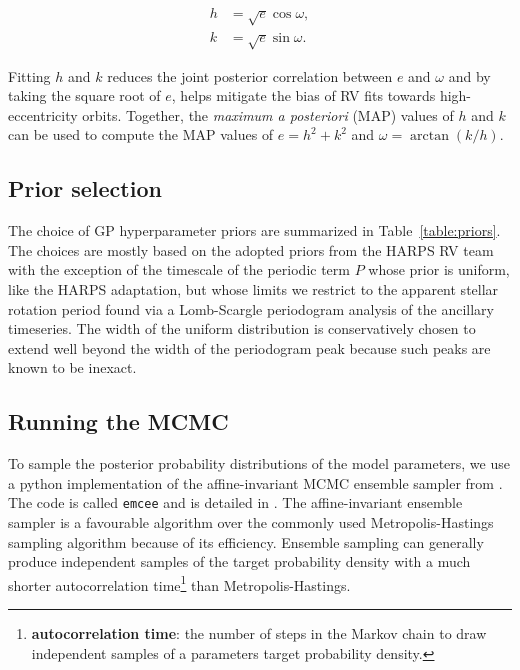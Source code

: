 \begin{align}
h &= \sqrt{e} \cos{\omega}, \\
k &= \sqrt{e} \sin{\omega}.
\end{align}

\noindent Fitting $h$ and $k$ reduces the joint posterior correlation between 
$e$ and $\omega$ and 
by taking the square root of $e$, helps mitigate the bias of RV fits towards 
high-eccentricity orbits. Together, the \emph{maximum a posteriori} (MAP) values of $h$ 
and $k$ can be used to compute the MAP values of $e=h^2 + k^2$ and $\omega=\arctan{(k/h)}$. 

\subsection{Prior selection}
The choice of GP hyperparameter priors are summarized in Table~\ref{table:priors}. 
The choices are mostly based on the adopted priors from the 
HARPS RV team with the exception of the timescale of the 
periodic term $P$ whose prior is uniform, like the HARPS adaptation, but whose 
limits we restrict to the apparent stellar rotation period found via a Lomb-Scargle 
periodogram analysis of the ancillary timeseries. The width of the uniform distribution 
is conservatively chosen 
to extend well beyond the width of the periodogram peak because such peaks are known 
to be inexact. \\



\subsection{Running the MCMC}
To sample the posterior probability distributions of the model parameters, we use a python 
implementation of the affine-invariant MCMC ensemble sampler from \cite{goodman10}. The code 
is called \texttt{emcee} and is detailed in \cite{foremanmackey13}. The affine-invariant 
ensemble sampler is a favourable algorithm over the commonly used Metropolis-Hastings sampling 
algorithm because of its efficiency. Ensemble sampling can generally produce independent samples 
of the target probability density with a much shorter autocorrelation 
time\footnote{\textbf{autocorrelation time}: the number of steps in the Markov chain to 
draw independent samples of a parameters target probability density.} than 
Metropolis-Hastings. \\
 
